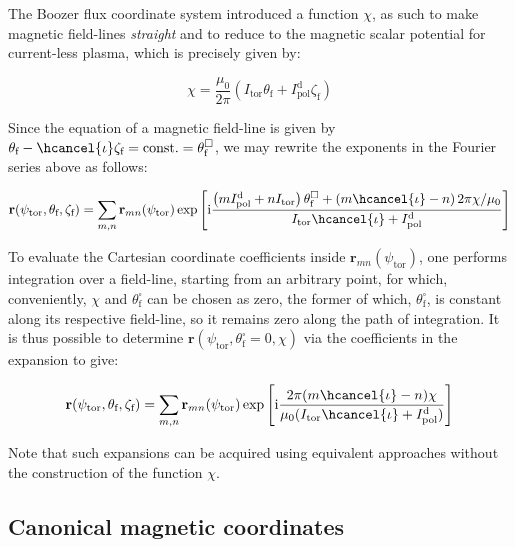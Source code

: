 The Boozer flux coordinate system introduced a function $\chi$, as such to make magnetic field-lines \textit{straight} and to reduce to the magnetic scalar potential for current-less plasma, which is precisely given by:

\begin{equation}
    \chi=\frac{\mu_0}{2\pi}\left(I_\text{tor}\theta_\text{f}+I_\text{pol}^\mathrm{d}\zeta_\text{f}\right)
\end{equation}

Since the equation of a magnetic field-line is given by $\theta_\text{f}-\hcancel{\iota}\zeta_\text{f}=\text{const.}=\theta_\text{f}^\square$, we may rewrite the exponents in the Fourier series above as follows:

\begin{equation}
    \mathbf{r}(\psi_\text{tor},\theta_\text{f},\zeta_\text{f})=\sum_{m,n}\mathbf{r}_{mn}(\psi_\text{tor})\exp{\left[\mathrm{i}\frac{\left(mI_\text{pol}^\mathrm{d}+nI_\text{tor}\right)\theta_\text{f}^\square+\left(m\hcancel{\iota}-n\right)2\pi\chi/\mu_0}{I_\text{tor}\hcancel{\iota}+I_\text{pol}^\mathrm{d}}\right]}
\end{equation}

To evaluate the Cartesian coordinate coefficients inside $\mathbf{r}_{mn}(\psi_\text{tor})$, one performs integration over a field-line, starting from an arbitrary point, for which, conveniently, $\chi$ and $\theta_\text{f}^\square$ can be chosen as zero, the former of which, $\theta_\text{f}^\square$, is constant along its respective field-line, so it remains zero along the path of integration. It is thus possible to determine $\mathbf{r}(\psi_\text{tor},\theta_\text{f}^\square=0,\chi)$ via the coefficients in the expansion to give:

\begin{equation}
    \mathbf{r}(\psi_\text{tor},\theta_\text{f},\zeta_\text{f})=\sum_{m,n}\mathbf{r}_{mn}(\psi_\text{tor})\exp{\left[\mathrm{i}\frac{2\pi(m\hcancel{\iota}-n)\chi}{\mu_0(I_\text{tor}\hcancel{\iota}+I_\text{pol}^\mathrm{d})}\right]}
\end{equation}

Note that such expansions can be acquired using equivalent approaches without the construction of the function $\chi$.

\subsection{Canonical magnetic coordinates}

